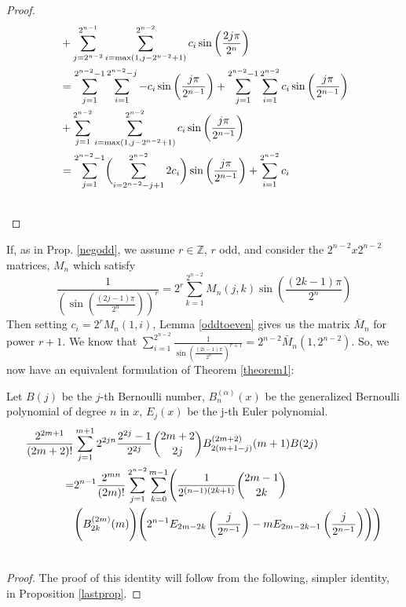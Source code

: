 \documentclass[fleqn,a4paper,9pt]{article}
\begin{document}
\begin{flushleft}
\begin{proof}
\begin{align}
&+\sum_{j=2^{n-2}}^{2^{n-1}}\sum_{i=\max(1,j-2^{n-2}+1)}^{2^{n-2}}c_i\sin\left(\frac{2j\pi}{2^n}\right)\\\notag
&=\sum_{j=1}^{2^{n-2}-1}  \sum_{i=1}^{2^{n-2}-j}-c_i\sin\left(\frac{j\pi}{2^{n-1}}\right)+\sum_{j=1}^{2^{n-2}-1}\sum_{i=1}^{2^{n-2}}c_i\sin\left(\frac{j\pi}{2^{n-1}}\right)\\\notag
&+\sum_{j=1}^{2^{n-2}}\sum_{i=\max(1,j-2^{n-2}+1)}^{2^{n-2}}c_i\sin\left(\frac{j\pi}{2^{n-1}}\right)\\\notag
&=\sum_{j=1}^{2^{n-2}-1}\biggl(\sum_{i=2^{n-2}-j+1}^{2^{n-2}}2c_i \biggr)\sin\left(\frac{j\pi}{2^{n-1}}\right)+\sum_{i=1}^{2^{n-2}}c_i\\\notag
\end{align}
\end{proof}
If, as in Prop. \ref{negodd}, we assume $r\in\mathbb{Z}$, $r$ odd, and consider the $2^{n-2}x2^{n-2}$ matrices, $M_n$ which satisfy $$\frac{1}{(\sin(\frac{(2j-1)\pi}{2^n}))^r}=2^r \sum_{k=1}^{2^{n-2}}M_n(j,k)\sin(\frac{(2k-1)\pi}{2^n})$$ Then setting $c_i=2^rM_n(1,i)$, Lemma \ref{oddtoeven} gives us the matrix $\bar{M}_n$ for power $r+1$. We know that $\sum_{i=1}^{2^{n-2}}\frac{1}{\sin\left(\frac{(2i-1)\pi}{2^n}\right)^{r+1}}=2^{n-2}\bar{M}_n(1,2^{n-2})$. So, we now have an equivalent formulation of Theorem \ref{theorem1}:
\begin{proposition}
Let $B(j)$ be the $j$-th Bernoulli number, $B_n^{(\alpha)}(x)$ be the generalized Bernoulli polynomial of degree $n$ in $x$, $E_j(x)$ be the j-th Euler polynomial.
\begin{align}\notag
\frac{2^{2m+1}}{(2m+2)!}&\sum_{j=1}^{m+1}2^{2jn}\frac{2^{2j}-1}{2^{2j}}\binom{2m+2}{2j}B_{2(m+1-j)}^{(2m+2)}(m+1) B(2 j)\\\notag
=&2^{n-1}\frac{2^{mn}}{(2m)!}\sum_{j=1}^{2^{n-2}}\sum_{k=0}^{m-1}\Biggl(\frac{1}{2^{(n-1)(2k+1)}}\binom{2m-1}{2k}\\\notag
&\Biggl(B_{2k}^{(2m)}(m)\Biggr)\Biggl(2^{n-1}E_{2m-2k}\left(\frac{j}{2^{n-1}}\right)-mE_{2m-2k-1}\left(\frac{j}{2^{n-1}}\right)\Biggr)\Biggr)\\\notag
\end{align}
\end{proposition}
\begin{proof}
The proof of this identity will follow from the following, simpler identity, in Proposition \ref{lastprop}.
\end{proof}


\end{flushleft}
\end{document}
